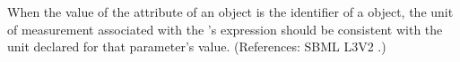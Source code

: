 When the value of the attribute  of an \EventAssignment
object is the identifier of a \Parameter object, the unit of measurement
associated with the \EventAssignment's  expression should be
consistent with the unit declared for that parameter's value.  (References:
SBML L3V2 .)
